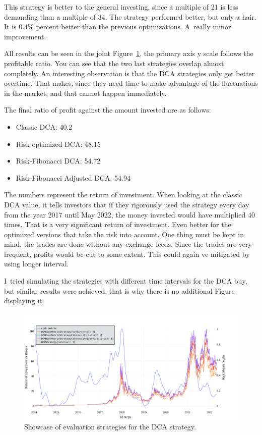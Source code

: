 This strategy is better to the general investing, since a multiple of 21 is less demanding than a multiple of 34. The strategy performed better, but only a hair. It is 0.4\% percent better than the previous optimizations. A~really minor improvement.

All results can be seen in the joint Figure~\ref{figure-dca-investing}, the primary axis y scale follows the profitable ratio. You can see that the two last strategies overlap almost completely. An interesting observation is that the DCA strategies only get better overtime. That makes, since they need time to make advantage of the fluctuations in the market, and that cannot happen immediately.

The final ratio of profit against the amount invested are as follows:
\begin{itemize}
    \item Classic DCA: 40.2
    \item Risk optimized DCA: 48.15
    \item Risk-Fibonacci DCA: 54.72
    \item Risk-Fibonacci Adjusted DCA: 54.94
\end{itemize}

The numbers represent the return of investment. When looking at the classic DCA value, it tells investors that if they rigorously used the strategy every day from the year 2017 until May 2022, the money invested would have multiplied 40 times. That is a very significant return of investment. Even better for the optimized versions that take the risk into account. One thing must be kept in mind, the trades are done without any exchange feeds. Since the trades are very frequent, profits would be cut to some extent. This could again ve mitigated by using longer interval.

I~tried simulating the strategies with different time intervals for the DCA buy, but similar results were achieved, that is why there is no additional Figure displaying it.

\begin{figure}[!hbt]
    \centering
    \includegraphics[width=\columnwidth]{figures/combined-dca-investing.pdf}
    \caption{Showcase of evaluation strategies for the DCA strategy.}
    \label{figure-dca-investing}
\end{figure}

